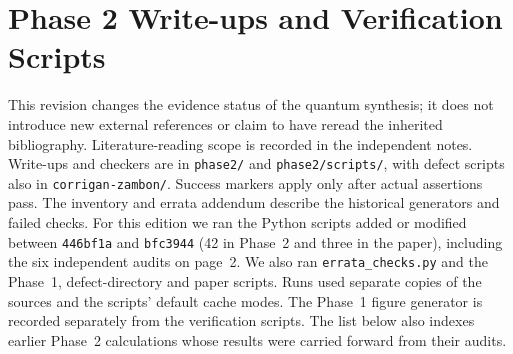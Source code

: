 \documentclass[11pt,a4paper]{article}
\newcommand{\file}[1]{\nolinkurl{#1}}
\theoremstyle{remark}\newtheorem{remark}[proposition]{Remark}
\begin{document}
\appendix\section{Phase 2 Write-ups and Verification Scripts}
This revision changes the evidence status of the quantum synthesis; it does
not introduce new external references or claim to have reread the inherited
bibliography. Literature-reading scope is recorded in the independent notes.
Write-ups and checkers are in \file{phase2/} and \file{phase2/scripts/},
with defect scripts also in \file{corrigan-zambon/}. Success markers apply only
after actual assertions pass. The inventory and errata addendum describe
the historical generators and failed checks. For this edition we ran the Python scripts added or modified between
\file{446bf1a} and \file{bfc3944} (42 in Phase~2 and three in the paper),
including the six independent audits on page~2. We also ran
\file{errata_checks.py} and the Phase~1, defect-directory and paper
scripts. Runs used separate copies of the sources and the scripts'
default cache modes. The Phase~1 figure generator is recorded separately
from the verification scripts. The list below also indexes earlier Phase~2
calculations whose results were carried forward from their audits.
\begingroup\raggedright
\end{document}
